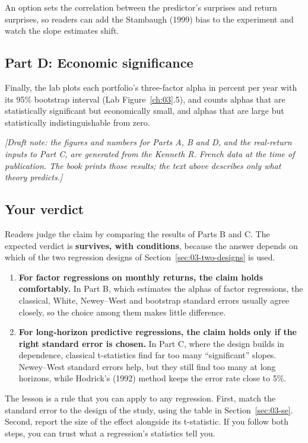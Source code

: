 An option sets the correlation between the predictor's surprises and return surprises, so readers can add the Stambaugh (1999) bias to the experiment and watch the slope estimates shift.

\subsection*{Part D: Economic significance}

Finally, the lab plots each portfolio's three-factor alpha in percent per year with its 95\% bootstrap interval (Lab Figure~\ref{ch:03}.5), and counts alphas that are statistically significant but economically small, and alphas that are large but statistically indistinguishable from zero.

\emph{[Draft note: the figures and numbers for Parts A, B and D, and the real-return inputs to Part C, are generated from the Kenneth R. French data at the time of publication. The book prints those results; the text above describes only what theory predicts.]}

\subsection*{Your verdict}

Readers judge the claim by comparing the results of Parts B and C. The expected verdict is \textbf{survives, with conditions}, because the answer depends on which of the two regression designs of Section~\ref{sec:03-two-designs} is used.

\begin{enumerate}
  \item \textbf{For factor regressions on monthly returns, the claim holds comfortably.} In Part B, which estimates the alphas of factor regressions, the classical, White, Newey--West and bootstrap standard errors usually agree closely, so the choice among them makes little difference.
  \item \textbf{For long-horizon predictive regressions, the claim holds only if the right standard error is chosen.} In Part C, where the design builds in dependence, classical t-statistics find far too many ``significant'' slopes. Newey--West standard errors help, but they still find too many at long horizons, while Hodrick's (1992) method keeps the error rate close to 5\%.
\end{enumerate}

The lesson is a rule that you can apply to any regression. First, match the standard error to the design of the study, using the table in Section~\ref{sec:03-se}. Second, report the size of the effect alongside its t-statistic. If you follow both steps, you can trust what a regression's statistics tell you.



